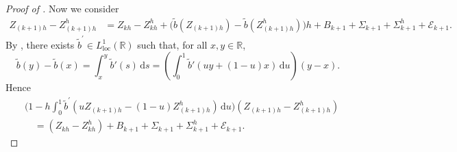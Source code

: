 \documentclass[onseside, final]{amsart}
\theoremstyle{definition}
\newcommand{\R}{\mathbb R}
\newcommand{\loc}{\mathrm{loc}}
\newcommand{\D}{\,\mathrm{d}}
\numberwithin{equation}{section}
\begin{document}
\begin{proof}[Proof of ]
			Now we consider
			\begin{equation}
				\begin{aligned}
					Z_{(k+1)h}-Z^h_{(k+1)h}& = Z_{kh} -Z^h_{kh} + \bigl(\tilde b(Z_{(k+1)h})-\tilde b(Z^h_{(k+1)h})\bigr)h
					+ B_{k + 1} + \Sigma_{k + 1} + \Sigma^h_{k + 1} + \mathcal E_{k + 1}.
				 \end{aligned}
			\end{equation}
			By , there exists $\tilde b^\prime \in L^1_\loc(\R)$ such that, for all $x,y\in\mathbb{R}$,
			\begin{equation}
				\tilde b(y)- \tilde b(x) = \int_x^y \tilde b'(s) \D s=\!\left(\int_0^1 \tilde b'(uy+(1-u)x) \D u\right)\!(y-x).
			\end{equation}
			Hence
			\begin{equation}\label{eq:conv1}
				\begin{aligned}
					&\Big(1 - h\int_0^1 \tilde b^\prime (uZ_{(k+1)h} -(1-u)Z^h_{(k+1)h}) \D u\Big)(Z_{(k+1)h} -Z^h_{(k+1)h})
					\\&\quad= (Z_{kh} -Z^h_{kh} )  
					+B_{k + 1} + \Sigma_{k + 1} + \Sigma^h_{k + 1} + \mathcal E_{k + 1}.
				\end{aligned}
			\end{equation}
			

\end{proof}
\end{document}

